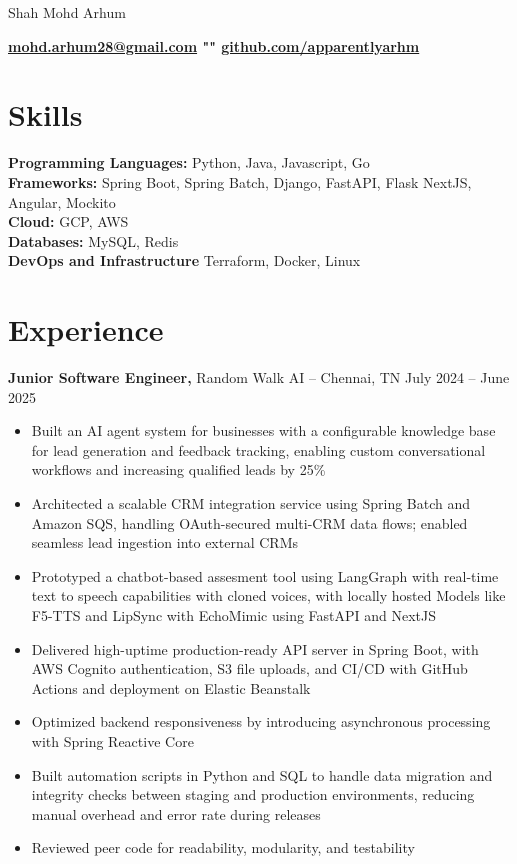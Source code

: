 \documentclass[12pt]{article}       %
\begin{document}
\centerline{\Huge Shah Mohd Arhum}

\vspace{5pt}

\centerline{\textbf{\href{mailto:mohd.arhum28@gmail.com}{mohd.arhum28@gmail.com} \textbar{} "" \textbar{} \href{https://github.com/apparentlyarhm}{github.com/apparentlyarhm}}}

\vspace{-10pt}

\section*{Skills}
\textbf{Programming Languages:} Python, Java, Javascript, Go \\
\textbf{Frameworks:} Spring Boot, Spring Batch, Django, FastAPI, Flask NextJS, Angular, Mockito \\
\textbf{Cloud:} GCP, AWS \\
\textbf{Databases:} MySQL, Redis \\
\textbf{DevOps and Infrastructure} Terraform, Docker, Linux

\vspace{-6.5pt}

\section*{Experience}
\textbf{Junior Software Engineer,} {Random Walk AI} -- Chennai, TN \hfill July 2024 -- June 2025 \\
\vspace{-9pt}
\begin{itemize}
    \item Built an AI agent system for businesses with a configurable knowledge base for lead generation and feedback tracking, enabling custom conversational workflows and increasing qualified leads by 25\%
    \item Architected a scalable CRM integration service using Spring Batch and Amazon SQS, handling OAuth-secured multi-CRM data flows; enabled seamless lead ingestion into external CRMs
    \item Prototyped a chatbot-based assesment tool using LangGraph with real-time text to speech capabilities with cloned voices, with locally hosted Models like F5-TTS and LipSync with EchoMimic using FastAPI and NextJS
    \item Delivered high-uptime production-ready API server in Spring Boot, with AWS Cognito authentication, S3 file uploads, and CI/CD with GitHub Actions and deployment on Elastic Beanstalk    
    \item Optimized backend responsiveness by introducing asynchronous processing with Spring Reactive Core 
    \item Built automation scripts in Python and SQL to handle data migration and integrity checks between staging and production environments, reducing manual overhead and error rate during releases
    \item Reviewed peer code for readability, modularity, and testability

\end{itemize}
\end{document}
